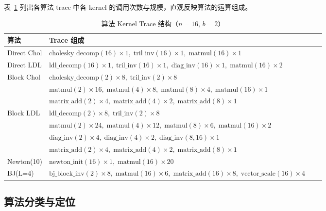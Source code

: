\documentclass[11pt,a4paper]{ctexart}
\begin{document}
表~\ref{tab:trace} 列出各算法 trace 中各 kernel 的调用次数与规模，直观反映算法的运算组成。

\begin{table}[H]
\centering
\caption{算法 Kernel Trace 结构（$n=16$, $b=2$）}
\label{tab:trace}
\small
\begin{tabular}{@{}llll@{}}
\toprule
\textbf{算法} & \textbf{Trace 组成} \\
\midrule
Direct Chol
    & $\text{cholesky\_decomp}(16)\times1,\;
       \text{tril\_inv}(16)\times1,\;
       \text{matmul}(16)\times1$ \\[4pt]
Direct LDL
    & $\text{ldl\_decomp}(16)\times1,\;
       \text{tril\_inv}(16)\times1,\;
       \text{diag\_inv}(16)\times1,\;
       \text{matmul}(16)\times2$ \\[4pt]
Block Chol
    & $\text{cholesky\_decomp}(2)\times8,\;
       \text{tril\_inv}(2)\times8$ \\
    & $\text{matmul}(2)\times16,\;
       \text{matmul}(4)\times8,\;
       \text{matmul}(8)\times4,\;
       \text{matmul}(16)\times1$ \\
    & $\text{matrix\_add}(2)\times4,\;
       \text{matrix\_add}(4)\times2,\;
       \text{matrix\_add}(8)\times1$ \\[4pt]
Block LDL
    & $\text{ldl\_decomp}(2)\times8,\;
       \text{tril\_inv}(2)\times8$ \\
    & $\text{matmul}(2)\times24,\;
       \text{matmul}(4)\times12,\;
       \text{matmul}(8)\times6,\;
       \text{matmul}(16)\times2$ \\
    & $\text{diag\_inv}(2)\times4,\;
       \text{diag\_inv}(4)\times2,\;
       \text{diag\_inv}(8,16)\times1$ \\
    & $\text{matrix\_add}(2)\times4,\;
       \text{matrix\_add}(4)\times2,\;
       \text{matrix\_add}(8)\times1$ \\[4pt]
Newton(10)
    & $\text{newton\_init}(16)\times1,\;
       \text{matmul}(16)\times20$ \\[4pt]
BJ(L=4)
    & $\text{bj\_block\_inv}(2)\times8,\;
       \text{matmul}(16)\times6,\;
       \text{matrix\_add}(16)\times8,\;
       \text{vector\_scale}(16)\times4$ \\
\bottomrule
\end{tabular}
\end{table}

\subsection{算法分类与定位}
\end{document}
